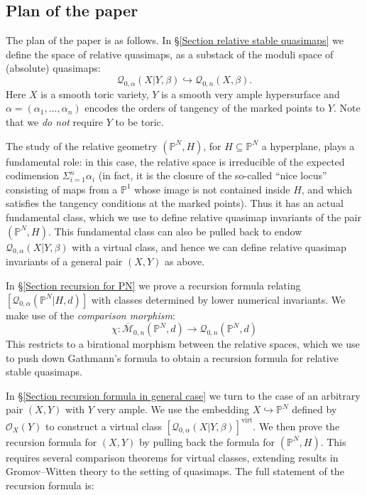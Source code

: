 \documentclass[10pt]{amsart}
\newcommand{\M}[4]{\overline{\mathcal{M}}_{#1,#2}(#3,#4)}
\newcommand{\Q}[4]{\mathcal{Q}_{#1,#2}(#3,#4)}
\newcommand{\PP}{\mathbb P}
\newcommand{\OO}{\mathcal{O}}
\renewcommand{\to}{\rightarrow}
\newcommand{\comp}{\chi}
\newcommand{\virt}[1]{[#1]^{\operatorname{virt}}}
\theoremstyle{definition}
\theoremstyle{definition}
\begin{document}
\subsection{Plan of the paper}
The plan of the paper is as follows. In \S \ref{Section relative stable quasimaps} we define the space of relative quasimaps, as a substack of the moduli space of (absolute) quasimaps:
\begin{equation*} \Q{0}{\alpha}{X|Y}{\beta} \hookrightarrow \Q{0}{n}{X}{\beta}. \end{equation*}
Here $X$ is a smooth toric variety, $Y$ is a smooth very ample hypersurface and $\alpha = (\alpha_1, \ldots, \alpha_n)$ encodes the orders of tangency of the marked points to $Y$. Note that we \emph{do not} require $Y$ to be toric.

The study of the relative geometry $(\PP^N,H)$, for $H \subseteq \PP^N$ a hyperplane, plays a fundamental role: in this case, the relative space is irreducible of the expected codimension $\Sigma_{i=1}^n \alpha_i$ (in fact, it is the closure of the so-called ``nice locus'' consisting of maps from a $\PP^1$ whose image is not contained inside $H$, and which satisfies the tangency conditions at the marked points). Thus it has an actual fundamental class, which we use to define relative quasimap invariants of the pair $(\PP^N,H)$. This fundamental class can also be pulled back to endow $\Q{0}{\alpha}{X|Y}{\beta}$ with a virtual  class, and hence we can define relative quasimap invariants of a general pair $(X,Y)$ as above.

In \S \ref{Section recursion for PN} we prove a recursion formula relating $[\Q{0}{\alpha}{\PP^N|H}{d}]$ with classes determined by lower numerical invariants. We make use of the \emph{comparison morphism}:
\begin{equation*} \comp : \M{0}{n}{\PP^N}{d} \to \Q{0}{n}{\PP^N}{d} \end{equation*} 
This restricts to a birational morphism between the relative spaces, which we use to push down Gathmann's formula to obtain a recursion formula for relative stable quasimaps.

In \S \ref{Section recursion formula in general case} we turn to the case of an arbitrary pair $(X,Y)$ with $Y$ very ample. We use the embedding $X \hookrightarrow \PP^N$ defined by $\OO_X(Y)$ to construct a virtual class $\virt{\Q{0}{\alpha}{X|Y}{\beta}}$.
We then prove the recursion formula for $(X,Y)$ by pulling back the formula for $(\PP^N,H)$. This requires several comparison theorems for virtual classes, extending results in Gromov--Witten theory to the setting of quasimaps. The full statement of the recursion formula is:
\end{document}
